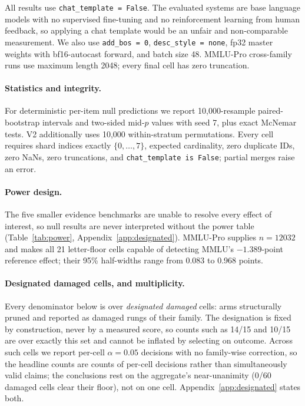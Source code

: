 All results use \texttt{chat\_template = False}. The evaluated systems are base language models with no supervised fine-tuning and no reinforcement learning from human feedback, so applying a chat template would be an unfair and non-comparable measurement. We also use \texttt{add\_bos = 0}, \texttt{desc\_style = none}, fp32 master weights with bf16-autocast forward, and batch size 48. MMLU-Pro cross-family runs use maximum length 2048; every final cell has zero truncation.

\paragraph{Statistics and integrity.}
For deterministic per-item null predictions we report 10,000-resample paired-bootstrap intervals and two-sided mid-$p$ values with seed 7, plus exact McNemar tests. V2 additionally uses 10,000 within-stratum permutations. Every cell requires shard indices exactly $\{0,\ldots,7\}$, expected cardinality, zero duplicate IDs, zero NaNs, zero truncations, and \texttt{chat\_template is False}; partial merges raise an error.

\paragraph{Power design.}
The five smaller evidence benchmarks are unable to resolve every effect of interest, so null results are never interpreted without the power table (Table~\ref{tab:power}, Appendix~\ref{app:designated}).
MMLU-Pro supplies $n=12032$ and makes all 21 letter-floor cells capable of detecting MMLU's $-1.389$-point reference effect; their 95\% half-widths range from 0.083 to 0.968 points.

\paragraph{Designated damaged cells, and multiplicity.}
Every denominator below is over \emph{designated damaged} cells: arms structurally pruned and reported as damaged rungs of their family. The designation is fixed by construction, never by a measured score, so counts such as 14/15 and 10/15 are over exactly this set and cannot be inflated by selecting on outcome. Across such cells we report per-cell $\alpha=0.05$ decisions with no family-wise correction, so the headline counts are counts of per-cell decisions rather than simultaneously valid claims; the conclusions rest on the aggregate's near-unanimity (0/60 damaged cells clear their floor), not on one cell. Appendix~\ref{app:designated} states both.
